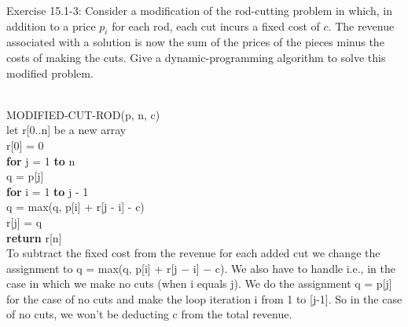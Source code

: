 \documentclass[addpoints,11pt]{exam}
\begin{document}
%
%
\begin{questions}
\question[5]
Exercise 15.1-3: Consider a modification of the rod-cutting problem in which, in addition to a price $p_i$ for each rod, each cut incurs a fixed cost of $c$.  The revenue associated with a solution is now the sum of the prices of the pieces minus the costs of making the cuts.  Give a dynamic-programming algorithm to solve this modified problem.
\begin{solutionorbox} 
\\
MODIFIED-CUT-ROD(p, n, c)\\
\hspace*{5mm} let r[0..n] be a new array\\
\hspace*{5mm} r[0] = 0\\
\hspace*{5mm}  \textbf{for} j = 1 \textbf{to} n\\
\hspace*{5mm} \hspace*{5mm} q = p[j] \\
\hspace*{5mm} \hspace*{5mm} \textbf{for} i = 1 \textbf{to} j - 1\\
\hspace*{5mm} \hspace*{5mm} \hspace*{5mm} q = max(q, p[i] + r[j - i] - c)\\
\hspace*{5mm} \hspace*{5mm} r[j] = q\\
\hspace*{5mm} \textbf{return} r[n]\\

 To subtract the fixed cost from the revenue for each added cut we change the assignment to q = max(q, p[i] + r[j − i] − c). We also have to handle i.e., in the case in which we make no cuts (when i equals j). We do the assignment q = p[j] for the case of no cuts and make the loop iteration i from 1 to [j-1]. So in the case of no cuts, we won't be deducting c from the total revenue.

\end{solutionorbox}

\ifprintanswers
\newpage
\else
\bigskip
\fi



\end{questions}
\end{document}
